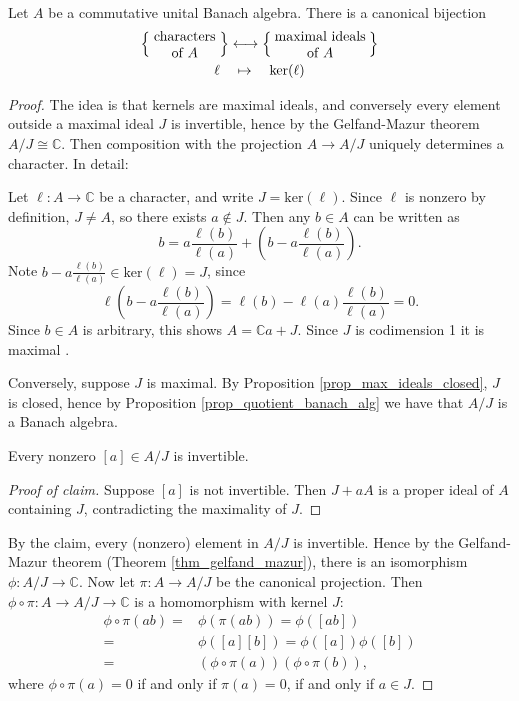 \documentclass[12pt]{article}
\begin{document}
\begin{theorem} %
\label{thm_character_correspondence}
	Let $A$ be a commutative unital Banach algebra. There is a canonical bijection
	\begin{gather*}
		\left\{\parbox{5em}{\centering{characters of $A$}}\right\} \longleftrightarrow \left\{\parbox{7em}{\centering{maximal ideals of $A$}}\right\} \\
		\ell \quad \mapsto \quad \ker(\ell)
	\end{gather*}
\end{theorem}
\begin{proof}
	The idea is that kernels are maximal ideals, and conversely every element outside a maximal ideal $J$ is invertible, hence by the Gelfand-Mazur theorem $A/J\cong\mathbb{C}$. Then composition with the projection $A\to A/J$ uniquely determines a character. In detail:

	Let $\ell:A\to\mathbb{C}$ be a character, and write $J=\text{ker}(\ell)$. Since $\ell$ is nonzero by definition, $J\neq A$, so there exists $a\not\in J$. Then any $b\in A$ can be written as 
	\begin{equation*}
		b = a\frac{\ell(b)}{\ell(a)} + \left(b - a\frac{\ell(b)}{\ell(a)}\right).
	\end{equation*}
	Note $b-a\frac{\ell(b)}{\ell(a)}\in\text{ker}(\ell)=J$, since 
	\begin{equation*}
		\ell\left(b - a\frac{\ell(b)}{\ell(a)}\right) = \ell(b) - \ell(a)\frac{\ell(b)}{\ell(a)} = 0.
	\end{equation*}
	Since $b\in A$ is arbitrary, this shows $A=\mathbb{C}a+J$. Since $J$ is codimension 1 it is maximal .

	Conversely, suppose $J$ is maximal. By Proposition \ref{prop_max_ideals_closed}, $J$ is closed, hence by Proposition \ref{prop_quotient_banach_alg} we have that $A/J$ is a Banach algebra.

	\begin{claim}
		Every nonzero $[a]\in A/J$ is invertible. 
	\end{claim}
	\begin{proof}[Proof of claim]
		Suppose $[a]$ is not invertible. Then $J+aA$ is a proper ideal of $A$ containing $J$, contradicting the maximality of $J$.
	\end{proof}

	By the claim, every (nonzero) element in $A/J$ is invertible. Hence by the Gelfand-Mazur theorem (Theorem \ref{thm_gelfand_mazur}), there is an isomorphism $\phi:A/J\to\mathbb{C}$. Now let $\pi:A\to A/J$ be the canonical projection. Then $\phi\circ\pi:A\to A/J\to\mathbb{C}$ is a homomorphism with kernel $J$:
	\begin{align*}
		\phi\circ\pi(ab) 
		=& \phi(\pi(ab)) = \phi([ab]) \\
		=& \phi([a][b]) = \phi([a])\phi([b]) \\
		=& (\phi\circ\pi(a))(\phi\circ\pi(b)),
	\end{align*}
	where $\phi\circ\pi(a)=0$ if and only if $\pi(a)=0$, if and only if $a\in J$.


\end{proof}
\end{document}
